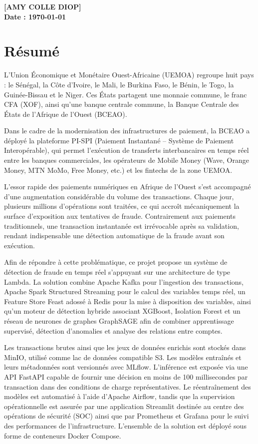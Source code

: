 \documentclass[12pt,a4paper,oneside]{book}
\theoremstyle{definition}
\theoremstyle{plain}
\begin{document}
\vspace{2cm}
\noindent\textbf{[AMY COLLE DIOP]}\\
\textbf{Date :  \today}
\cleardoublepage

\chapter*{Résumé}

L'Union Économique et Monétaire Ouest-Africaine (UEMOA) regroupe huit pays : le Sénégal, la Côte d'Ivoire, le Mali, le Burkina Faso, le Bénin, le Togo, la Guinée-Bissau et le Niger. Ces États partagent une monnaie commune, le franc CFA (XOF), ainsi qu'une banque centrale commune, la Banque Centrale des États de l'Afrique de l'Ouest (BCEAO).

Dans le cadre de la modernisation des infrastructures de paiement, la BCEAO a déployé la plateforme PI-SPI (Paiement Instantané – Système de Paiement Interopérable), qui permet l'exécution de transferts interbancaires en temps réel entre les banques commerciales, les opérateurs de Mobile Money (Wave, Orange Money, MTN MoMo, Free Money, etc.) et les fintechs de la zone UEMOA.

L'essor rapide des paiements numériques en Afrique de l'Ouest s'est accompagné d'une augmentation considérable du volume des transactions. Chaque jour, plusieurs millions d'opérations sont traitées, ce qui accroît mécaniquement la surface d'exposition aux tentatives de fraude. Contrairement aux paiements traditionnels, une transaction instantanée est irrévocable après sa validation, rendant indispensable une détection automatique de la fraude avant son exécution.

Afin de répondre à cette problématique, ce projet propose un système de détection de fraude en temps réel s'appuyant sur une architecture de type Lambda. La solution combine Apache Kafka pour l'ingestion des transactions, Apache Spark Structured Streaming pour le calcul des variables temps réel, un Feature Store Feast adossé à Redis pour la mise à disposition des variables, ainsi qu'un moteur de détection hybride associant XGBoost, Isolation Forest et un réseau de neurones de graphes GraphSAGE afin de combiner apprentissage supervisé, détection d'anomalies et analyse des relations entre comptes.

Les transactions brutes ainsi que les jeux de données enrichis sont stockés dans MinIO, utilisé comme lac de données compatible S3. Les modèles entraînés et leurs métadonnées sont versionnés avec MLflow. L'inférence est exposée via une API FastAPI capable de fournir une décision en moins de 100 millisecondes par transaction dans des conditions de charge représentatives. Le réentraînement des modèles est automatisé à l'aide d'Apache Airflow, tandis que la supervision opérationnelle est assurée par une application Streamlit destinée au centre des opérations de sécurité (SOC) ainsi que par Prometheus et Grafana pour le suivi des performances de l'infrastructure. L'ensemble de la solution est déployé sous forme de conteneurs Docker Compose.
\end{document}
